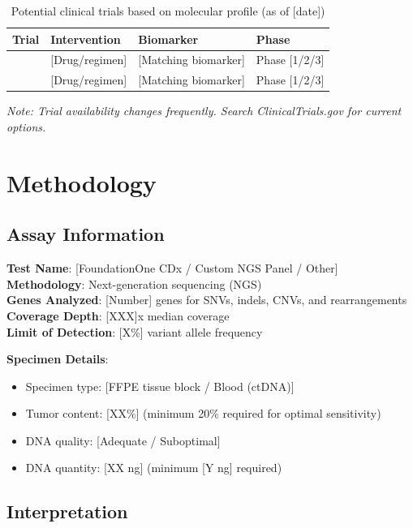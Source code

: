 \documentclass[10pt,letterpaper]{article}
\begin{document}
\begin{table}[H]
\centering
\small
\begin{tabular}{llll}
\toprule
\textbf{Trial} & \textbf{Intervention} & \textbf{Biomarker} & \textbf{Phase} \\
\midrule
[NCT Number] & [Drug/regimen] & [Matching biomarker] & Phase [1/2/3] \\
[NCT Number] & [Drug/regimen] & [Matching biomarker] & Phase [1/2/3] \\
\bottomrule
\end{tabular}
\caption{Potential clinical trials based on molecular profile (as of [date])}
\end{table}

\textit{Note: Trial availability changes frequently. Search ClinicalTrials.gov for current options.}

\section{Methodology}

\subsection{Assay Information}

\textbf{Test Name}: [FoundationOne CDx / Custom NGS Panel / Other]\\
\textbf{Methodology}: Next-generation sequencing (NGS)\\
\textbf{Genes Analyzed}: [Number] genes for SNVs, indels, CNVs, and rearrangements\\
\textbf{Coverage Depth}: [XXX]x median coverage\\
\textbf{Limit of Detection}: [X\%] variant allele frequency

\textbf{Specimen Details}:
\begin{itemize}
\item Specimen type: [FFPE tissue block / Blood (ctDNA)]
\item Tumor content: [XX\%] (minimum 20\% required for optimal sensitivity)
\item DNA quality: [Adequate / Suboptimal]
\item DNA quantity: [XX ng] (minimum [Y ng] required)
\end{itemize}

\subsection{Interpretation}
\end{document}
